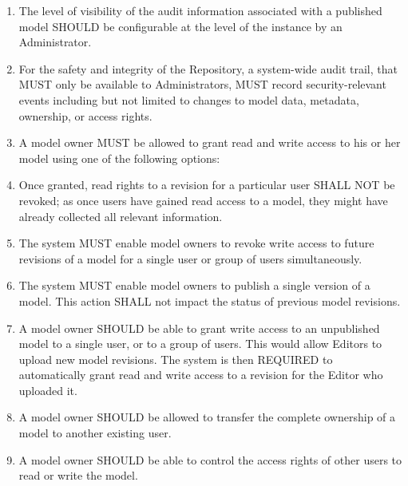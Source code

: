 \begin{enumerate}[1]
\item The level of visibility of the audit information associated with a published model SHOULD be configurable at the level of the instance by an Administrator.

\item For the safety and integrity of the Repository, a system-wide audit trail, that MUST only be available to Administrators, MUST record security-relevant events including but not limited to changes to model data, metadata, ownership, or access rights. 

\item A model owner MUST be allowed to grant read and write access to his or her model using one of the following options:

\item Once granted, read rights to a revision for a particular user SHALL NOT be revoked; as once users have gained read access to a model, they might have already collected all relevant information.

\item The system MUST enable model owners to revoke write access to future revisions of a model for a single user or group of users simultaneously.

\item The system MUST enable model owners to publish a single version of a model. This action SHALL not impact the status of previous model revisions. 

\item A model owner SHOULD be able to grant write access to an unpublished model to a single user, or to a group of users. This would allow Editors to upload new model revisions. The system is then REQUIRED to automatically grant read and write access to a revision for the Editor who uploaded it.

\item A model owner SHOULD be allowed to transfer the complete ownership of a model to another existing user.

\item A model owner SHOULD be able to control the access rights of other users to read or write the model.


\end{enumerate}

